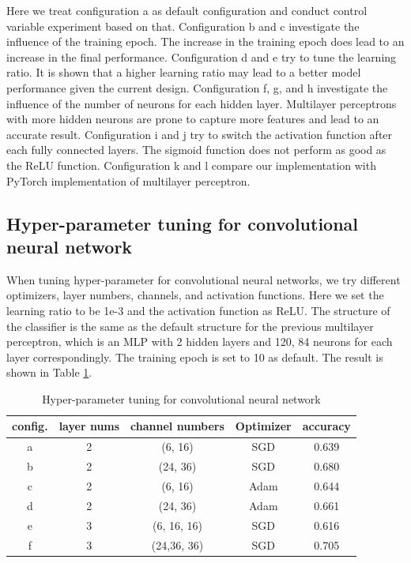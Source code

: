\documentclass[11pt]{scrartcl}
\begin{document}
Here we treat configuration a as default configuration and conduct control variable experiment based on that. Configuration b and c investigate the influence of the training epoch. The increase in the training epoch does lead to an increase in the final performance. Configuration d and e try to tune the learning ratio. It is shown that a higher learning ratio may lead to a better model performance given the current design. Configuration f, g, and h investigate the influence of the number of neurons for each hidden layer. Multilayer perceptrons with more hidden neurons are prone to capture more features and lead to an accurate result. Configuration i and j try to switch the activation function after each fully connected layers. The sigmoid function does not perform as good as the ReLU function. Configuration k and l compare our implementation with PyTorch implementation of multilayer perceptron.

\subsection{Hyper-parameter tuning for convolutional neural network}

When tuning hyper-parameter for convolutional neural networks, we try different optimizers, layer numbers, channels, and activation functions. Here we set the learning ratio to be 1e-3 and the activation function as ReLU. The structure of the classifier is the same as the default structure for the previous multilayer perceptron, which is an MLP with 2 hidden layers and 120, 84 neurons for each layer correspondingly. The training epoch is set to 10 as default. The result is shown in Table \ref{CNN}.

\begin{table}[H]
	\centering
	\begin{tabular}{c|cccc}
		\hline
		config. & layer nums & channel numbers & Optimizer & accuracy  \\
		\hline
		a & 2 & (6, 16) 	& SGD  & 0.639 \\
		b & 2 & (24, 36) 	& SGD  & 0.680 \\
		c & 2 & (6, 16)  	& Adam & 0.644 \\
		d & 2 & (24, 36) 	& Adam & 0.661 \\
		e & 3 & (6, 16, 16) & SGD  & 0.616 \\
		f & 3 & (24,36, 36) & SGD  & 0.705 \\
		\hline
	\end{tabular} 
	\caption{Hyper-parameter tuning for convolutional neural network}
	\label{CNN}
\end{table}
\end{document}
